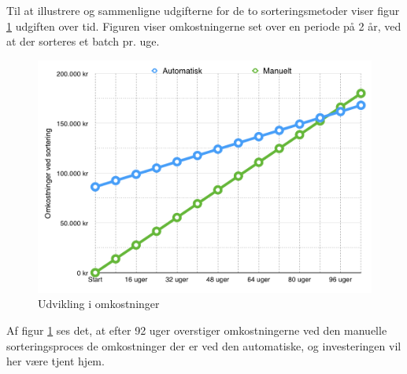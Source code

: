 \newpage
Til at illustrere og sammenligne udgifterne for de to sorteringsmetoder viser figur \ref{fig:costbenefit} udgiften over tid. Figuren viser omkostningerne set over en periode på 2 år, ved at der sorteres et batch pr. uge.

\begin{figure}[H]
	\centering
	\includegraphics[width=1\textwidth]{billeder/Hovedrapport/costbenefit2.png}
	\caption{Udvikling i omkostninger }
	\label{fig:costbenefit}
\end{figure}

Af figur \ref{fig:costbenefit} ses det, at efter 92 uger overstiger omkostningerne ved den manuelle sorteringsproces de omkostninger der er ved den automatiske, og investeringen vil her være tjent hjem. 
